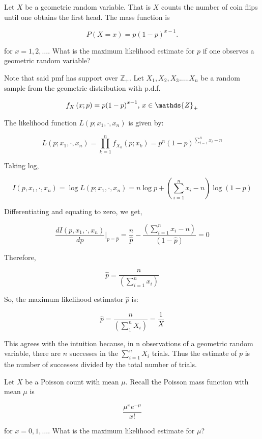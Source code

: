 \documentclass{homework}
\begin{document}
\begin{tcolorbox}[title=Question 5]
Let $X$ be a geometric random variable. That is $X$ counts the number of coin flips until one obtains the first head. The mass function is 

$$
 P(X = x) = p(1 - p)^{x-1}. 
$$

for $x=1,2,\ldots$. What is the maximum likelihood estimate for $p$ if one observes a geometric random variable?
\end{tcolorbox}

Note that said pmf has support over $\mathds{Z}_{+}$. Let $ {X}_{1}, {X}_{2}, {X}_{3}.....{X}_{n} $ be a random sample from the geometric distribution with p.d.f.

$$ f_{X}\left(x;p \right)=p{\left(1-p \right)}^{x-1}\textnormal{, } x \in \mathds{Z}_{+}$$

The likelihood function $L(p;x_1, \cdot, x_n)$ is given by:

$$ L(p;x_1, \cdot, x_n)=\prod_{k=1}^{n} f_{X_{k}}(p;x_k)={p}^{n}{\left(1-p \right)}^{\sum_{i=1}^{n}{x}_{i}-n} $$

Taking log,

$$ I(p, x_1, \cdot, x_n) = \log L(p;x_1, \cdot, x_n)= n\log{p}+\left(\sum_{i=1}^{n}{x}_{i}-n \right)\log{\left(1-p \right)} $$

Differentiating and equating to zero, we get,

$$ \frac{dI(p, x_1, \cdot, x_n)}{dp}\bigg|_{p=\hat{p}}=\frac{n}{\hat{p}} -\frac{\left(\sum_{i=1}^{n}{x}_{i}-n \right)}{\left(1-\hat{p} \right)}=0 $$

Therefore,

$$ \hat{p}=\frac{n}{\left(\sum_{i=1}^{n}{x}_{i} \right)} $$

So, the maximum likelihood estimator $\hat{p}$ is:

$$ \hat{p}=\frac{n}{\left(\sum_{1}^{n}{X}_{i} \right)}=\frac{1}{X} $$

This agrees with the intuition because, in n observations of a geometric random variable, there are $n$ successes in the $\sum_{i=1}^{n}{X}_{i} $ trials. Thus the estimate of $p$ is the number of successes divided by the total number of trials. \\

\begin{tcolorbox}[title=Question 6]
Let $X$ be a Poisson count with mean $\mu$. Recall the Poisson mass function with mean $\mu$ is

$$ \frac{\mu^x e^{-\mu}}{x!}  $$

for $x = 0,1,\ldots$. What is the maximum likelihood estimate for $\mu$?
\end{tcolorbox}
\end{document}
